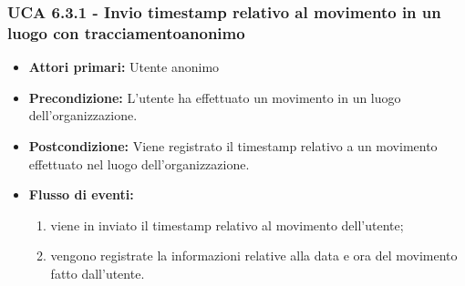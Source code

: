 \subsubsection{UCA 6.3.1 - Invio timestamp relativo al movimento in un luogo con tracciamentoanonimo}
\begin{itemize}
	\item \textbf{Attori primari:} Utente anonimo
	\item \textbf{Precondizione:} L'utente ha effettuato un movimento in un luogo dell'organizzazione.
	\item \textbf{Postcondizione:} Viene registrato il timestamp relativo a un movimento effettuato nel luogo dell'organizzazione.
	\item \textbf{Flusso di eventi:}
	\begin{enumerate}
		\item viene in inviato il timestamp relativo al movimento dell'utente;
		\item vengono registrate la informazioni relative alla data e ora del movimento fatto dall'utente.
	\end{enumerate}
\end{itemize}


